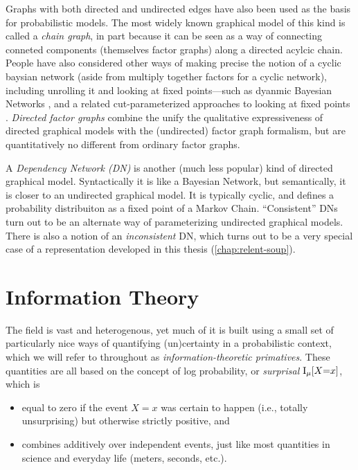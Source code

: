Graphs with both directed and undirected edges have also been used as the basis for probabilistic models.
The most widely known graphical model of this kind is called a \emph{chain graph}, in part because it can be seen as a way of connecting conneted components (themselves factor graphs) along a directed acylcic chain.
People have also considered other ways of making precise the notion of a cyclic baysian network (aside from multiply together factors for a cyclic network), including unrolling it and looking at fixed points---such as dyanmic Bayesian Networks \citep{dean1989model}\citep[\S6.2]{KF09}, and a related cut-parameterized approaches to looking at fixed points \citep{Baier_2022}.
\emph{Directed factor graphs} \citep{frey2012extending}
combine the unify the qualitative expressiveness of directed graphical models with the (undirected) factor graph formalism,
but are quantitatively no different from ordinary factor graphs.


A \emph{Dependency Network (DN)} is another
    (much less popular) kind of directed graphical model.
Syntactically it is like a Bayesian Network, but semantically, it is closer to an undirected graphical model. 
It is typically cyclic, and defines a probability distribuiton as a fixed point of a Markov Chain. 
``Consistent'' DNs turn out to be an alternate way of parameterizing undirected graphical models.
There is also a notion of an \emph{inconsistent} DN, which turns out to be a very special case of a representation developed in this thesis (\cref{chap:relent-soup}).


\section{Information Theory}
    \label{sec:prelim-infotheory}

%
%
The field is vast and heterogenous, 
    yet much of it is built using a small set of 
    particularly nice ways of quantifying (un)certainty in a probabilistic
    context, which we will refer to throughout as \emph{information-theoretic primatives}.
These quantities are all based on the concept of log probability, or \emph{surprisal} $\operatorname{\mathrm{I}}_{\mu}[ X{=}x]$, which is
\begin{itemize}[nosep]
\item equal to zero if the event $X{=}x$ was certain to happen (i.e., totally unsurprising) but otherwise strictly positive, and
\item combines additively over independent events, just like most quantities in science and everyday life (meters, seconds, etc.).
\end{itemize}

